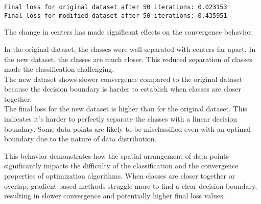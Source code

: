 \documentclass[11pt]{article}
\begin{document}
    \begin{Verbatim}[commandchars=\\\{\}]
Final loss for original dataset after 50 iterations: 0.023153
Final loss for modified dataset after 50 iterations: 0.435951
    \end{Verbatim}

    The change in centers has made significant effects on the convergence
behavior.

In the original dataset, the classes were well-separated with centers
far apart. In the new dataset, the classes are much closer. This reduced
separation of classes made the classification challenging.\\
The new dataset shows slower convergence compared to the original
dataset because the decision boundary is harder to establish when
classes are closer together.\\
The final loss for the new dataset is higher than for the original
dataset. This indicates it's harder to perfectly separate the classes
with a linear decision boundary. Some data points are likely to be
misclassified even with an optimal boundary due to the nature of data
distribution.

This behavior demonstrates how the spatial arrangement of data points
significantly impacts the difficulty of the classification and the
convergence properties of optimization algorithms. When classes are
closer together or overlap, gradient-based methods struggle more to find
a clear decision boundary, resulting in slower convergence and
potentially higher final loss values.


    
    
    
\end{document}
